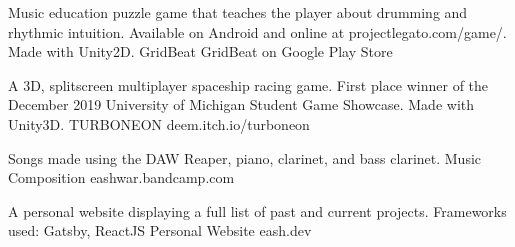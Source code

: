 \documentclass[]{awesome-cv}
\begin{document}

\vspace{-6mm}
\vspace{-2mm}

	\cventry
	{Music education puzzle game that teaches the player about drumming and rhythmic intuition. Available on Android and online at projectlegato.com/game/.
	 Made with Unity2D.}
	{GridBeat}
	{GridBeat on Google Play Store}
	{}
	{}

	\vspace{-6mm}
	\cventry
	{A 3D, splitscreen multiplayer spaceship racing game. First place winner of the December 2019 University of Michigan Student Game Showcase.
	 Made with Unity3D.}
	{TURBONEON}
	{deem.itch.io/turboneon}
	{}
	{}


	
	\vspace{-6mm}
	\cventry
	{Songs made using the DAW Reaper, piano, clarinet, and bass clarinet.}
	{Music Composition}
	{eashwar.bandcamp.com}
	{}
	{}
	
	\vspace{-6mm}
	\cventry
	{A personal website displaying a full list of past and current projects. Frameworks used: Gatsby, ReactJS}
	{Personal Website}
	{eash.dev}
	{}
	{}
	
	\vspace{-5mm}
\end{document}
